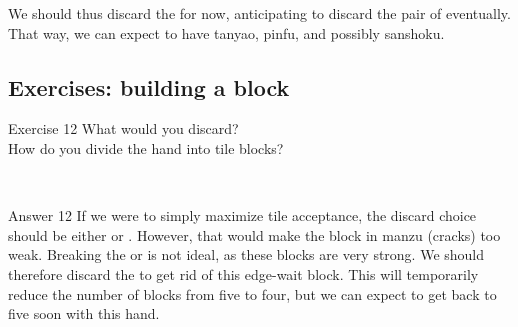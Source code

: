 \emj
We should thus discard the {\LARGE{}} for now, anticipating to discard the pair of {\LARGE{}} eventually. That way, we can expect to have {\jap tanyao}, {\jap pinfu}, and possibly {\jap sanshoku}. 

\vfill

\subsection*{Exercises: building a block}

\bigskip

\bigskip

\begin{itembox}[l]{Exercise 12}
What would you discard? \\
\vsp
How do you divide the hand into tile blocks? 

\vspace{-30pt}
\bp
{}\\ \vspace{-16pt}
\rfw{}
\ep
\end{itembox}

\newpage

\begin{itembox}[r]{Answer 12}
\emj
If we were to simply maximize tile acceptance, the discard choice should be either {\LARGE{}} or {\LARGE\rfw}. However, that would make the block in {\jap manzu} (cracks) too weak. Breaking the {\LARGE{}} or {\LARGE{}} is not ideal, as these blocks are very strong. We should therefore discard the {\LARGE{}} to get rid of this edge-wait block. This will temporarily reduce the number of blocks from five to four, but we can expect to get back to five soon with this hand. 
\end{itembox}

\vfill

